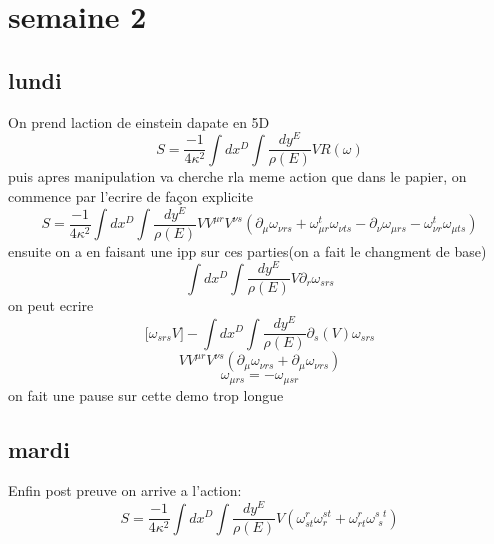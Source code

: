 \documentclass{article}
\begin{document}
\section{semaine 2}
\subsection{lundi}
On prend laction de einstein dapate en 5D
\begin{equation}
    S = \frac{-1}{4 \kappa^2}\int dx^D\int \frac{dy^E}{\rho(E)}VR(\omega)
\end{equation}
puis apres manipulation va cherche rla meme action que dans le papier, on commence par l'ecrire de façon explicite
\begin{equation}
    S=\frac{-1}{4 \kappa^2}\int dx^D\int \frac{dy^E}{\rho(E)}V V^{\mu r} V^{\nu s}(\partial_{\mu}\omega_{\nu r s}+\omega_{\mu r}^t \omega_{\nu ts }-\partial_{\nu}\omega_{\mu r s}-\omega_{\nu r}^t \omega_{\mu ts })
\end{equation}
ensuite on a en faisant une ipp sur ces parties(on a fait le changment de base)
\[\int dx^D\int \frac{dy^E}{\rho(E)}V\partial_{r}\omega_{s r s}\]
on peut ecrire 
\[  \Big[ \omega_{srs}V \Big]-\int dx^D\int \frac{dy^E}{\rho(E)}\partial_s (V )\omega_{srs}\]
\begin{equation}
    V V^{\mu r} V^{\nu s}(\partial_{\mu}\omega_{\nu r s}+ \partial_{\mu}\omega_{\nu r s})
\end{equation}
\[\omega_{\mu r s}= -\omega_{\mu s r}\]
on fait une pause sur cette demo trop longue
\clearpage
\subsection{mardi} 
Enfin post preuve on arrive a l'action: 
\begin{equation}
    S = \frac{-1}{4 \kappa^2}\int dx^D \int \frac{dy^E}{\rho(E)}V(\omega^{r}_{st}\omega^{st}_r+\omega^r_{rt}\omega^{s\, \, t}_{\, \, s})
\end{equation}
\end{document}
